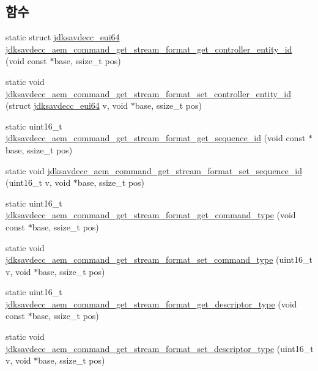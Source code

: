 \subsection*{함수}
\begin{DoxyCompactItemize}
\item 
static struct \hyperlink{structjdksavdecc__eui64}{jdksavdecc\+\_\+eui64} \hyperlink{group__command__get__stream__format_ga781a01e53a70dbe68e7cedaf38a0ce2a}{jdksavdecc\+\_\+aem\+\_\+command\+\_\+get\+\_\+stream\+\_\+format\+\_\+get\+\_\+controller\+\_\+entity\+\_\+id} (void const $\ast$base, ssize\+\_\+t pos)
\item 
static void \hyperlink{group__command__get__stream__format_ga8db04c735f96a31f917f93fd3a7a1a14}{jdksavdecc\+\_\+aem\+\_\+command\+\_\+get\+\_\+stream\+\_\+format\+\_\+set\+\_\+controller\+\_\+entity\+\_\+id} (struct \hyperlink{structjdksavdecc__eui64}{jdksavdecc\+\_\+eui64} v, void $\ast$base, ssize\+\_\+t pos)
\item 
static uint16\+\_\+t \hyperlink{group__command__get__stream__format_gac4bf131f26412d05d5e7cda6acbc716e}{jdksavdecc\+\_\+aem\+\_\+command\+\_\+get\+\_\+stream\+\_\+format\+\_\+get\+\_\+sequence\+\_\+id} (void const $\ast$base, ssize\+\_\+t pos)
\item 
static void \hyperlink{group__command__get__stream__format_gaa7d21b30a9afa676d41e1b31498180ee}{jdksavdecc\+\_\+aem\+\_\+command\+\_\+get\+\_\+stream\+\_\+format\+\_\+set\+\_\+sequence\+\_\+id} (uint16\+\_\+t v, void $\ast$base, ssize\+\_\+t pos)
\item 
static uint16\+\_\+t \hyperlink{group__command__get__stream__format_gaaca6253fba5d92ed869eb956f49e6ffd}{jdksavdecc\+\_\+aem\+\_\+command\+\_\+get\+\_\+stream\+\_\+format\+\_\+get\+\_\+command\+\_\+type} (void const $\ast$base, ssize\+\_\+t pos)
\item 
static void \hyperlink{group__command__get__stream__format_ga87f6fea5774cc69c9685cb45b3945452}{jdksavdecc\+\_\+aem\+\_\+command\+\_\+get\+\_\+stream\+\_\+format\+\_\+set\+\_\+command\+\_\+type} (uint16\+\_\+t v, void $\ast$base, ssize\+\_\+t pos)
\item 
static uint16\+\_\+t \hyperlink{group__command__get__stream__format_gaf5d93e6937b07e97ce41c7c49489d62c}{jdksavdecc\+\_\+aem\+\_\+command\+\_\+get\+\_\+stream\+\_\+format\+\_\+get\+\_\+descriptor\+\_\+type} (void const $\ast$base, ssize\+\_\+t pos)
\item 
static void \hyperlink{group__command__get__stream__format_ga103013fa4032c9507f7794c230d5c16b}{jdksavdecc\+\_\+aem\+\_\+command\+\_\+get\+\_\+stream\+\_\+format\+\_\+set\+\_\+descriptor\+\_\+type} (uint16\+\_\+t v, void $\ast$base, ssize\+\_\+t pos)

\end{DoxyCompactItemize}
